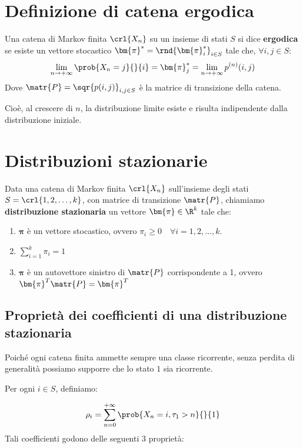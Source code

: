 \documentclass[\main/main.tex]{subfiles}
\begin{document}
\section{Definizione di catena ergodica}
\begin{definition}
	Una catena di Markov finita \(\crl{X_n}\) su un insieme di stati \(S\) si dice \textbf{ergodica} se esiste un vettore stocastico \(\bm{\pi}^* = \rnd{\bm{\pi}_i^*}_{i \in S}\) tale che, \(\forall i,j \in S\):
	\[
		\lim_{n\rightarrow+\infty} \prob{X_n = j}{}{i} = \bm{\pi}_j^* = \lim_{n \rightarrow + \infty} p^{(n)} (i,j)
	\]
	Dove \(\matr{P} = \sqr{p(i,j)}_{i,j \in S}\) è la matrice di transizione della catena.

	Cioè, al crescere di \(n\), la distribuzione limite esiste e risulta indipendente dalla distribuzione iniziale.
\end{definition}

\section{Distribuzioni stazionarie}
\begin{definition}
	Data una catena di Markov finita \(\crl{X_n}\) sull'insieme degli stati \(S = \crl{1,2, \ldots, k}\), con matrice di transizione \(\matr{P}\), chiamiamo \textbf{distribuzione stazionaria} un vettore \(\bm{\pi} \in \R^k\) tale che:
	\begin{enumerate}
		\item \(\bm{\pi}\) è un vettore stocastico, ovvero \(\pi_i \geq 0 \quad \forall i = 1,2,\ldots, k\).
		\item \(\sum_{i=1}^k \pi_i = 1\)
		\item \(\bm{\pi}\) è un autovettore sinistro di \(\matr{P}\) corrispondente a 1, ovvero \(\bm{\pi}^T \matr{P} = \bm{\pi}^T\)
	\end{enumerate}
\end{definition}

\subsection{Proprietà dei coefficienti di una distribuzione stazionaria}
Poiché ogni catena finita ammette sempre una classe ricorrente, senza perdita di generalità possiamo supporre che lo stato \(1\) sia ricorrente.

Per ogni \(i \in S\), definiamo:

\[
	\rho_i = \sum_{n=0}^{+\infty} \prob{X_n = i, \tau_1 > n}{}{1}
\]
Tali coefficienti godono delle seguenti 3 proprietà:
\end{document}
